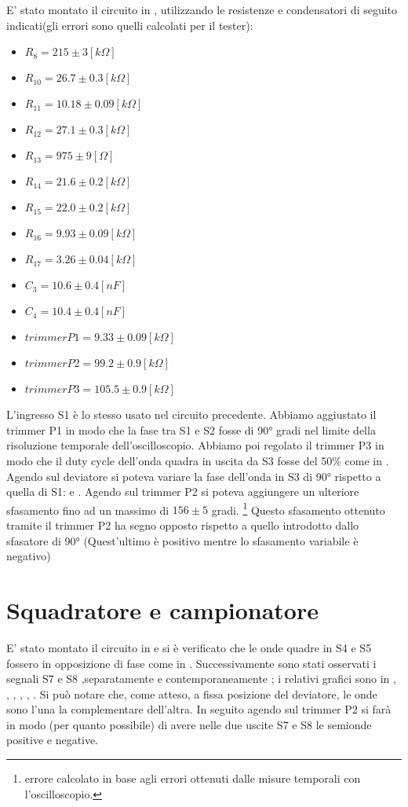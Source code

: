 E' stato montato il circuito in , utilizzando le resistenze e condensatori di seguito indicati(gli errori sono quelli calcolati per il tester):
\begin{itemize}
\item $R_8=215 \pm 3[k\Omega]$
\item $R_{10}=26.7 \pm 0.3[k\Omega]$
\item $R_{11}=10.18 \pm 0.09[k\Omega]$
\item $R_{12}=27.1 \pm 0.3[k\Omega]$
\item $R_{13}=975 \pm 9[\Omega]$
\item $R_{14}=21.6 \pm 0.2[k\Omega]$
\item $R_{15}=22.0 \pm 0.2[k\Omega]$
\item $R_{16}=9.93 \pm 0.09[k\Omega]$
\item $R_{17}=3.26 \pm 0.04[k\Omega]$
\item $C_3=10.6 \pm 0.4[nF]$
\item $C_4=10.4 \pm 0.4[nF]$
\item $trimmer P1 = 9.33 \pm  0.09[k\Omega]$
\item $trimmer P2 = 99.2 \pm  0.9[k\Omega]$
\item $trimmer P3 = 105.5 \pm  0.9[k\Omega]$
\end{itemize} 
L'ingresso S1 è lo stesso usato nel circuito precedente.
Abbiamo aggiustato il trimmer P1 in modo che la fase tra S1 e S2 fosse di \ang{90} gradi nel limite della risoluzione temporale dell'oscilloscopio.
Abbiamo poi regolato il trimmer P3 in modo che il duty cycle dell'onda quadra in uscita da S3 fosse del 50\% come in .
Agendo sul deviatore si poteva variare la fase dell'onda in S3 di \ang{90} rispetto a quella di S1:   e .
Agendo sul trimmer P2 si poteva aggiungere un ulteriore sfasamento fino ad un massimo di $156 \pm 5$ gradi. \footnote{errore calcolato in base agli errori ottenuti dalle misure temporali con l'oscilloscopio.} Questo sfasamento ottenuto tramite il trimmer P2 ha segno opposto rispetto a quello introdotto dallo sfasatore di \ang{90} (Quest'ultimo è positivo mentre lo sfasamento variabile è negativo)

\section{Squadratore e campionatore}
E' stato montato il circuito in  e si è verificato che le onde quadre in S4 e S5 fossero in opposizione di fase come in . Successivamente sono stati osservati i segnali S7 e S8 ,separatamente e contemporaneamente ; i relativi grafici sono in , , , , , . Si può notare che, come atteso, a fissa posizione del deviatore, le onde sono l'una la complementare dell'altra. In seguito agendo sul trimmer P2 si farà in modo (per quanto possibile) di avere nelle due uscite S7 e S8 le semionde positive e negative.
